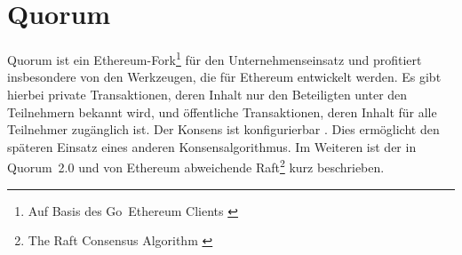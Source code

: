 

\section{Quorum}\label{impl:quorum}

Quorum ist ein Ethereum-Fork\footnote{Auf Basis des Go~Ethereum Clients \autocite{w:quorum-jpmorgan:github}} für den Unternehmenseinsatz und profitiert insbesondere von den Werkzeugen, die für Ethereum entwickelt werden.
Es gibt hierbei private Transaktionen, deren Inhalt nur den Beteiligten unter den Teilnehmern bekannt wird, und öffentliche Transaktionen, deren Inhalt für alle Teilnehmer zugänglich ist.
Der Konsens ist konfigurierbar%
. Dies ermöglicht den späteren Einsatz eines anderen Konsensalgorithmus.
Im Weiteren ist der in Quorum~2.0 und von Ethereum abweichende Raft\footnote{The Raft Consensus Algorithm \autocite{p:raft}} kurz beschrieben.

